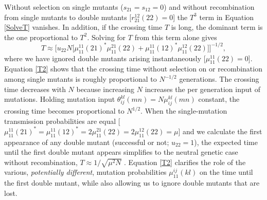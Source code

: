 \documentclass[review,3p,authoryear]{elsarticle}
\begin{document}
\begin{appendices}
Without selection on single mutants ($s_{21}=s_{12}=0$) and without recombination from single mutants to double mutants [$r_{21}^{12}(22) = 0$] the $T^3$ term in Equation \eqref{SolveT} vanishes.
In addition, if the crossing time $T$ is long, the dominant term is the one proportional to $T^2$.
Solving for $T$ from this term alone gives
\begin{equation}\label{T2}
T \approx \Big[u_{22} N \big[ \mu_{11}^{11}(21)^* \mu_{11}^{21}(22) + \mu_{11}^{11}(12)^* \mu_{11}^{12}(22) \big] \Big]^{-1/2},
\end{equation}
where we have ignored double mutants arising instantaneously [$\mu_{11}^{11}(22)=0$].
Equation \eqref{T2} shows that the crossing time without selection on or recombination among single mutants is roughly proportional to $N^{-1/2}$ generations.
The crossing time decreases with $N$ because increasing $N$ increases the per generation input  of mutations.
Holding mutation input $\theta_{ij}^{kl}(mn)=N\mu_{ij}^{kl}(mn)$ constant, the crossing time becomes proportional to $N^{1/2}$. 
When the single-mutation transmission probabilities are equal [$\mu_{11}^{11}(21)^* = \mu_{11}^{11}(12)^* = 2\mu_{11}^{21}(22) = 2\mu_{11}^{12}(22) = \mu$] and we calculate the first appearance of any double mutant (successful or not; $u_{22}=1$), the expected time until the first double mutant appears simplifies to the neutral genetic case without recombination, $T\approx 1/\sqrt{\mu^2N}$ \citep[equation 8 in][]{Christiansen1998}.
Equation \eqref{T2} clarifies the role of the various, \textit{potentially different}, mutation probabilities $\mu_{11}^{ij}(kl)$ on the time until the first double mutant, while also allowing us to ignore double mutants that are lost.  



\end{appendices}
\end{document}
